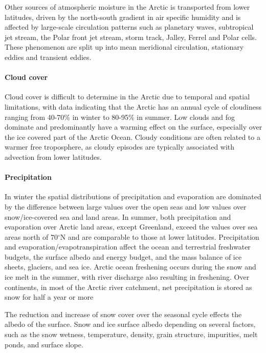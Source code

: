 \documentclass[11pt, oneside]{article}
\begin{document}
Other sources of atmospheric moisture in the Arctic is transported from lower latitudes, driven by the north-south gradient in air specific humidity and is affected by large-scale circulation patterns such as planetary waves, subtropical jet stream, the Polar front jet stream, storm track, Jalley, Ferrel and Polar cells. These phenomenon are split up into mean meridional circulation, stationary eddies and transient eddies. 



\paragraph{Cloud cover}
Cloud cover is difficult to determine in the Arctic due to temporal and spatial limitations, with data indicating that the Arctic has an annual cycle of cloudiness ranging from 40-70\% in winter to 80-95\% in summer. Low clouds and fog dominate and predominantly have a warming effect on the surface, especially over the ice covered part of the Arctic Ocean. Cloudy conditions are often related to a warmer free troposphere, as cloudy episodes are typically associated with advection from lower latitudes. 


\paragraph{Precipitation}
In winter the spatial distributions of precipitation and evaporation are dominated by the difference between large values over the open seas and low values over snow/ice-covered sea and land areas. In summer, both precipitation and evaporation over Arctic land areas, except Greenland, exceed the values over sea areas north of 70$^{\circ}$N and are comparable to those at lower latitudes. Precipitation and evaporation/evapotranspiration affect the ocean and terrestrial freshwater budgets, the surface albedo and energy budget, and the mass balance of ice sheets, glaciers, and sea ice. Arctic ocean freshening occurs during the snow and ice melt in the summer, with river discharge also resulting in freshening. Over continents, in most of the Arctic river catchment, net precipitation is stored as snow for half a year or more

The reduction and increase of snow cover over the seasonal cycle effects the albedo of the surface. Snow and ice surface albedo depending on several factors, such as the snow wetness, temperature, density, grain structure, impurities, melt ponds, and surface slope. 
\end{document}
